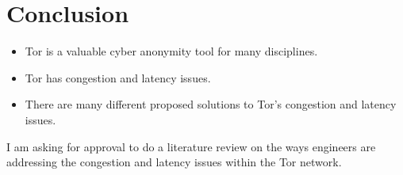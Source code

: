\documentclass[letterpaper,13pt]{texMemo}
\begin{document}
\section*{Conclusion}
\begin{itemize}
    \item
    Tor is a valuable cyber anonymity tool for many disciplines.
    \item
    Tor has congestion and latency issues.
    \item
    There are many different proposed solutions to Tor's congestion and latency issues.
\end{itemize}
I am asking for approval to do a literature review on the ways engineers are addressing the
congestion and latency issues within the Tor network.



\end{document}

